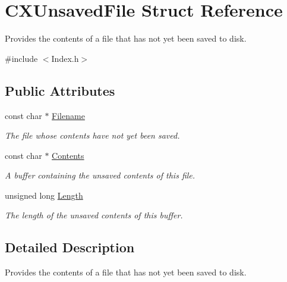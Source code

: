 \hypertarget{structCXUnsavedFile}{}\section{C\+X\+Unsaved\+File Struct Reference}
\label{structCXUnsavedFile}


Provides the contents of a file that has not yet been saved to disk.  




{\ttfamily \#include $<$Index.\+h$>$}

\subsection*{Public Attributes}
\begin{DoxyCompactItemize}
\item 
const char $\ast$ \mbox{\hyperlink{structCXUnsavedFile_aa8bf5d4351628ee8502b517421e8b418}{Filename}}
\begin{DoxyCompactList}\small\item\em The file whose contents have not yet been saved. \end{DoxyCompactList}\item 
\mbox{\label{structCXUnsavedFile_afaa926937db049b854f17f995bbc8d47}} 
const char $\ast$ \mbox{\hyperlink{structCXUnsavedFile_afaa926937db049b854f17f995bbc8d47}{Contents}}
\begin{DoxyCompactList}\small\item\em A buffer containing the unsaved contents of this file. \end{DoxyCompactList}\item 
\mbox{\label{structCXUnsavedFile_aee644cd64b25d8ed0ab92a1016fad9a8}} 
unsigned long \mbox{\hyperlink{structCXUnsavedFile_aee644cd64b25d8ed0ab92a1016fad9a8}{Length}}
\begin{DoxyCompactList}\small\item\em The length of the unsaved contents of this buffer. \end{DoxyCompactList}\end{DoxyCompactItemize}


\subsection{Detailed Description}
Provides the contents of a file that has not yet been saved to disk. 

